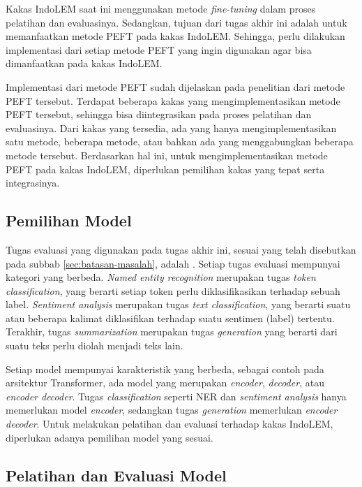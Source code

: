 Kakas IndoLEM saat ini menggunakan metode \textit{fine-tuning} dalam proses pelatihan dan evaluasinya. Sedangkan, tujuan dari tugas akhir ini adalah untuk memanfaatkan metode PEFT pada kakas IndoLEM. Sehingga, perlu dilakukan implementasi dari setiap metode PEFT yang ingin digunakan agar bisa dimanfaatkan pada kakas IndoLEM.

Implementasi dari metode PEFT sudah dijelaskan pada penelitian dari metode PEFT tersebut. Terdapat beberapa kakas yang mengimplementasikan metode PEFT tersebut, sehingga bisa diintegrasikan pada proses pelatihan dan evaluasinya. Dari kakas yang tersedia, ada yang hanya mengimplementasikan satu metode, beberapa metode, atau bahkan ada yang menggabungkan beberapa metode tersebut. Berdasarkan hal ini, untuk mengimplementasikan metode PEFT pada kakas IndoLEM, diperlukan pemilihan kakas yang tepat serta integrasinya.

\subsection{Pemilihan Model}

Tugas evaluasi yang digunakan pada tugas akhir ini, sesuai yang telah disebutkan pada subbab \ref{sec:batasan-masalah}, adalah \nlptask. Setiap tugas evaluasi mempunyai kategori yang berbeda. \textit{Named entity recognition} merupakan tugas \textit{token classification}, yang berarti setiap token perlu diklasifikasikan terhadap sebuah label. \textit{Sentiment analysis} merupakan tugas \textit{text classification},  yang berarti suatu atau beberapa kalimat diklasifikan terhadap suatu sentimen (label) tertentu. Terakhir, tugas \textit{summarization} merupakan tugas \textit{generation} yang berarti dari suatu teks perlu diolah menjadi teks lain.

Setiap model mempunyai karakteristik yang berbeda, sebagai contoh pada arsitektur Transformer, ada model yang merupakan \textit{encoder}, \textit{decoder}, atau \textit{encoder decoder}. Tugas \textit{classification} seperti NER dan \textit{sentiment analysis} hanya memerlukan model \textit{encoder}, sedangkan tugas \textit{generation} memerlukan \textit{encoder decoder}. Untuk melakukan pelatihan dan evaluasi terhadap kakas IndoLEM, diperlukan adanya pemilihan model yang sesuai.

\subsection{Pelatihan dan Evaluasi Model}


